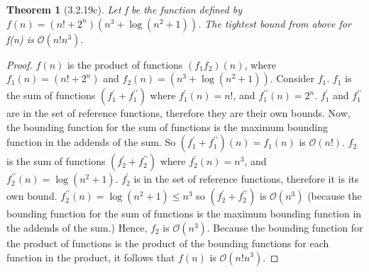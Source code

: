 \documentclass[a4paper, 12pt]{article}
\theoremstyle{plain}
\newtheorem*{theorem*}{Theorem}
\begin{document}
	
	\begin{theorem*}[3.2.19c]
		Let f be the function defined by \newline $f(n) = (n! + 2^{n})(n^{3} + \log(n^{2} + 1))$. The tightest bound from above for f(n) is $\mathcal{O}(n!n^{3})$.
	\end{theorem*}
	
	\begin{proof}
		$f(n)$ is the product of functions $(f_1 f_2)(n)$, where $f_1(n) = (n! + 2^{n})$ and $f_2(n) = (n^{3} + \log(n^{2} + 1))$.
		\newline \indent Consider $f_1$. $f_1$ is the sum of functions $(f_1^\prime + f_1^{\prime\prime})$ where $f_1^\prime(n) = n!$, and $f_1^{\prime\prime}(n) = 2^{n}$. $f_1^\prime$ and $f_1^{\prime\prime}$ are in the set of reference functions, therefore they are their own bounds. Now, the bounding function for the sum of functions is the maximum bounding function in the addends of the sum. So $(f_1^\prime + f_1^{\prime\prime})(n) = f_1(n)$ is $\mathcal{O}(n!)$.
		\newline \indent $f_2$ is the sum of functions $(f_2^\prime + f_2^{\prime\prime})$ where $f_2^\prime(n) = n^{3}$, and $f_2^{\prime\prime}(n) = \log(n^{2} + 1)$. $f_2^\prime$ is in the set of reference functions, therefore it is its own bound. $f_2^{\prime\prime}(n) = \log(n^{2} + 1) \le n^{3}$ so $(f_2^\prime + f_2^{\prime\prime})$ is $\mathcal{O}(n^{3})$ (because the bounding function for the sum of functions is the maximum bounding function in the addends of the sum.) Hence, $f_2$ is $\mathcal{O}(n^{3})$.
		\newline \indent Because the bounding function for the product of functions is the product of the bounding functions for each function in the product, it follows that $f(n)$ is $\mathcal{O}(n!n^{3})$.
	\end{proof}
\end{document}
